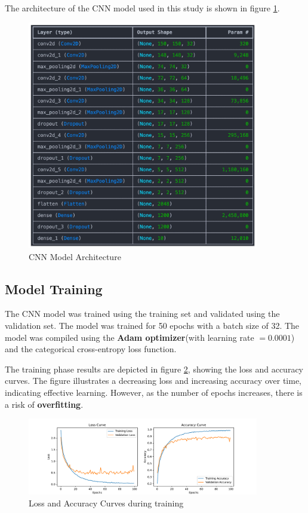 \documentclass[11.5pt]{article}
\begin{document}
The architecture of the CNN model \cite{ghildiyalMusicGenreClassification2020} used in this study is shown in figure \ref{fig:cnn_architecture}.
\begin{figure}[H]
    \centering
    \includegraphics[width=0.9\textwidth]{graphics/model_architecture.jpg}
    \caption{CNN Model Architecture}
    \label{fig:cnn_architecture}
\end{figure}

\subsection{Model Training}
The CNN model was trained using the training set and validated using the validation set. The model was trained for 50 epochs with a batch size of 32. The model was compiled using the \textbf{Adam optimizer}(with learning rate $=0.0001$) and the categorical cross-entropy loss function.

The training phase results are depicted in figure \ref{fig:loss_accuracy}, showing the loss and accuracy curves. The figure illustrates a decreasing loss and increasing accuracy over time, indicating effective learning. However, as the number of epochs increases, there is a risk of \textbf{overfitting}.
\begin{figure}[H]
    \centering
    \includegraphics[width=0.9\textwidth]{graphics/loss_accuracy.pdf}
    \caption{Loss and Accuracy Curves during training}
    \label{fig:loss_accuracy}
\end{figure}
\end{document}
